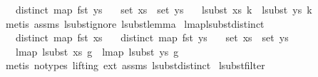 \begin{isabellebody}
\ \ \ {\isachardoublequoteopen}distinct\ {\isacharparenleft}{\kern0pt}map\ fst\ ys{\isacharparenright}{\kern0pt}{\isachardoublequoteclose}\isanewline
\ \ \ {\isachardoublequoteopen}set\ xs\ {\isacharequal}{\kern0pt}\ set\ ys{\isachardoublequoteclose}\isanewline
\ \ \ {\isachardoublequoteopen}lsubst\ xs\ k\ {\isacharequal}{\kern0pt}\ lsubst\ ys\ k{\isachardoublequoteclose}\isanewline
%
\isadelimproof
%
\endisadelimproof
%
\isatagproof
{}\isamarkupfalse%
\ {\isacharparenleft}{\kern0pt}metis\ assms{\isacharparenleft}{\kern0pt}{}{\isacharcomma}{\kern0pt}{}{\isacharcomma}{\kern0pt}{}{\isacharparenright}{\kern0pt}\ lsubst{\isacharunderscore}{\kern0pt}ignore\ lsubst{\isacharunderscore}{\kern0pt}lemma{}{\isacharparenright}{\kern0pt}%
\endisatagproof
{\isafoldproof}%
%
\isadelimproof
\isanewline
%
\endisadelimproof
\isanewline
\isanewline
\isanewline
{}\isamarkupfalse%
\ lmap{\isacharunderscore}{\kern0pt}lsubst{\isacharunderscore}{\kern0pt}distinct{\isacharcolon}{\kern0pt}\isanewline
\ \ \ {\isachardoublequoteopen}distinct\ {\isacharparenleft}{\kern0pt}map\ fst\ xs{\isacharparenright}{\kern0pt}{\isachardoublequoteclose}\isanewline
\ \ \ {\isachardoublequoteopen}distinct\ {\isacharparenleft}{\kern0pt}map\ fst\ ys{\isacharparenright}{\kern0pt}{\isachardoublequoteclose}\isanewline
\ \ \ {\isachardoublequoteopen}set\ xs\ {\isacharequal}{\kern0pt}\ set\ ys{\isachardoublequoteclose}\isanewline
\ \ \ {\isachardoublequoteopen}lmap\ {\isacharparenleft}{\kern0pt}lsubst\ xs{\isacharparenright}{\kern0pt}\ g\ {\isacharequal}{\kern0pt}\ lmap\ {\isacharparenleft}{\kern0pt}lsubst\ ys{\isacharparenright}{\kern0pt}\ g{\isachardoublequoteclose}\isanewline
%
\isadelimproof
%
\endisadelimproof
%
\isatagproof
{}\isamarkupfalse%
\ {\isacharparenleft}{\kern0pt}metis\ {\isacharparenleft}{\kern0pt}no{\isacharunderscore}{\kern0pt}types{\isacharcomma}{\kern0pt}\ lifting{\isacharparenright}{\kern0pt}\ ext\ assms{\isacharparenleft}{\kern0pt}{}{\isacharcomma}{\kern0pt}{}{\isacharcomma}{\kern0pt}{}{\isacharparenright}{\kern0pt}\ lsubst{\isacharunderscore}{\kern0pt}distinct{\isacharparenright}{\kern0pt}%
\endisatagproof
{\isafoldproof}%
%
\isadelimproof
\isanewline
%
\endisadelimproof
\isanewline
\isanewline
{}\isamarkupfalse%
\ lsubst{\isacharunderscore}{\kern0pt}filter{\isacharcolon}{\kern0pt}\isanewline

\end{isabellebody}
